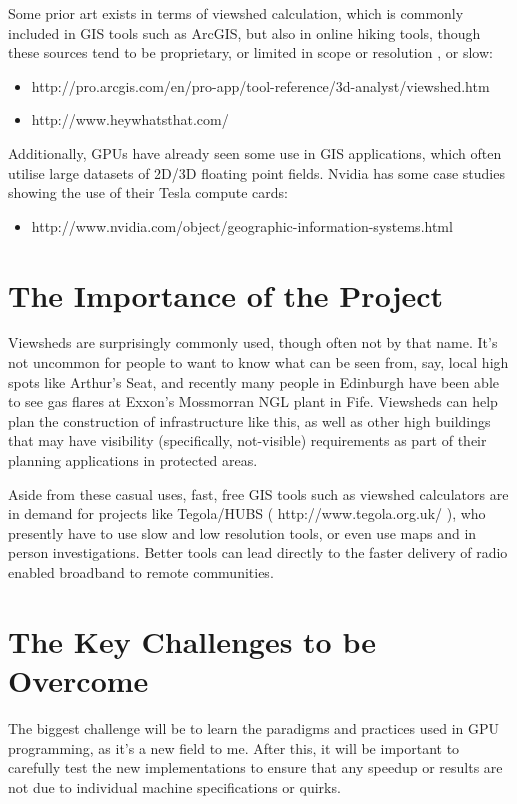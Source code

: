 \documentclass[a4paper]{article}
\begin{document}
        Some prior art exists in terms of viewshed calculation, which is commonly included in GIS tools such as ArcGIS,
        but also in online hiking tools, though these sources tend to be proprietary, or limited in scope or resolution
        , or slow:
        \begin{itemize}
            \item http://pro.arcgis.com/en/pro-app/tool-reference/3d-analyst/viewshed.htm
            \item http://www.heywhatsthat.com/
        \end{itemize}

        Additionally, GPUs have already seen some use in GIS applications, which often utilise large datasets of 2D/3D
        floating point fields. Nvidia has some case studies showing the use of their Tesla compute cards:
        \begin{itemize}
            \item http://www.nvidia.com/object/geographic-information-systems.html
        \end{itemize}

    \section{The Importance of the Project}
        Viewsheds are surprisingly commonly used, though often not by that name. It's not uncommon for people to want
        to know what can be seen from, say, local high spots like Arthur's Seat, and recently many people in Edinburgh
        have been able to see gas flares at Exxon's Mossmorran NGL plant in Fife. Viewsheds can help plan the
        construction of infrastructure like this, as well as other high buildings that may have visibility
        (specifically, not-visible) requirements as part of their planning applications in protected areas.

        Aside from these casual uses, fast, free GIS tools such as viewshed calculators are in demand for projects like
        Tegola/HUBS ( http://www.tegola.org.uk/ ), who presently have to use slow and low resolution tools, or even use
        maps and in person investigations. Better tools can lead directly to the faster delivery of radio enabled
        broadband to remote communities.

    \section{The Key Challenges to be Overcome}
        The biggest challenge will be to learn the paradigms and practices used in GPU programming, as it's a new field
        to me. After this, it will be important to carefully test the new implementations to ensure that any speedup or
        results are not due to individual machine specifications or quirks.
\end{document}
